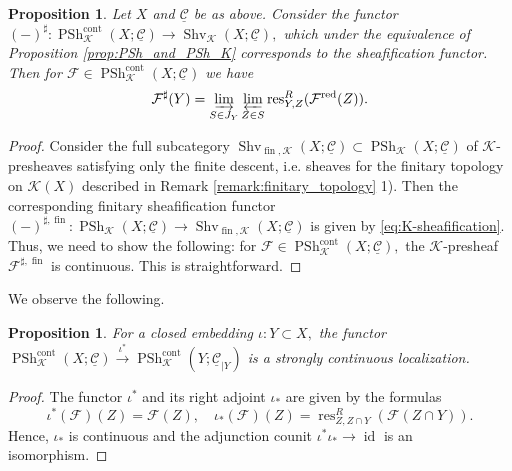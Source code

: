 \documentclass[11pt,leqno]{amsart}
\newtheorem{prop}[theo]{Proposition}
\numberwithin{equation}{section}
\newcommand{\ms}[1]{\mathscr{#1}}
\newcommand{\msK}{\ms{K}}
\newcommand{\indlim}[1][]{\mathop{\varinjlim}\limits_{#1}}
\newcommand{\prolim}[1][]{\mathop{\varprojlim}\limits_{#1}}
\newcommand{\xto}{\xrightarrow}
\newcommand{\fin}{\operatorname{fin}}
\newcommand{\cont}{\operatorname{cont}}
\newcommand{\red}{\operatorname{red}}
\newcommand{\cF}{{\mathcal F}}
\newcommand{\cC}{{\mathcal C}}
\newcommand{\un}{\underline}
\newcommand{\PSh}{\operatorname{PSh}}
\newcommand{\Sh}{\operatorname{Shv}}
\newcommand{\res}{\operatorname{res}}
\newcommand{\id}{\operatorname{id}}
\begin{document}
\begin{prop}Let $X$ and $\un{\cC}$ be as above. Consider the functor $(-)^{\sharp}:\PSh_{\msK}^{\cont}(X;\un{\cC})\to\Sh_{\msK}(X;\un{\cC}),$ which under the equivalence of Proposition \ref{prop:PSh_and_PSh_K} corresponds to the sheafification functor. Then for $\cF\in \PSh_{\msK}^{\cont}(X;\un{\cC})$ we have
\begin{equation}\label{eq:K-sheafification}\cF^{\sharp}(Y)=\indlim[S\in J_Y]\prolim[Z\in S]\res_{Y,Z}^R(\cF^{\red}(Z)).\end{equation}\end{prop}

\begin{proof}
Consider the full subcategory $\Sh_{\fin,\msK}(X;\un{\cC})\subset \PSh_{\msK}(X;\un{\cC})$ of $\msK$-presheaves satisfying only the finite descent, i.e. sheaves for the finitary topology on $\msK(X)$ described in Remark \ref{remark:finitary_topology} 1). Then the corresponding finitary sheafification functor $(-)^{\sharp,\fin}:\PSh_{\msK}(X;\un{\cC})\to \Sh_{\fin,\msK}(X;\un{\cC})$ is given by \eqref{eq:K-sheafification}. Thus, we need to show the following: for $\cF\in \PSh^{\cont}_{\msK}(X;\un{\cC}),$ the $\msK$-presheaf $\cF^{\sharp,\fin}$ is continuous. This is straightforward.
\end{proof}





We observe the following.

\begin{prop}\label{prop:closed_embedding_pullback_PSh^cont} For a closed embedding $\iota:Y\subset X,$ the functor $\PSh^{\cont}_{\msK}(X;\un{\cC})\xto{\iota^*} \PSh^{\cont}_{\msK}(Y;\un{\cC}_{\mid Y})$ is a strongly continuous localization.\end{prop}

\begin{proof}
The functor $\iota^*$ and its right adjoint $\iota_*$ are given by the formulas
$$\iota^*(\cF)(Z)=\cF(Z),\quad \iota_*(\cF)(Z)=\res_{Z,Z\cap Y}^R(\cF(Z\cap Y)).$$
Hence, $\iota_*$ is continuous and the adjunction counit $\iota^*\iota_*\to \id$ is an isomorphism.\end{proof}
\end{document}
